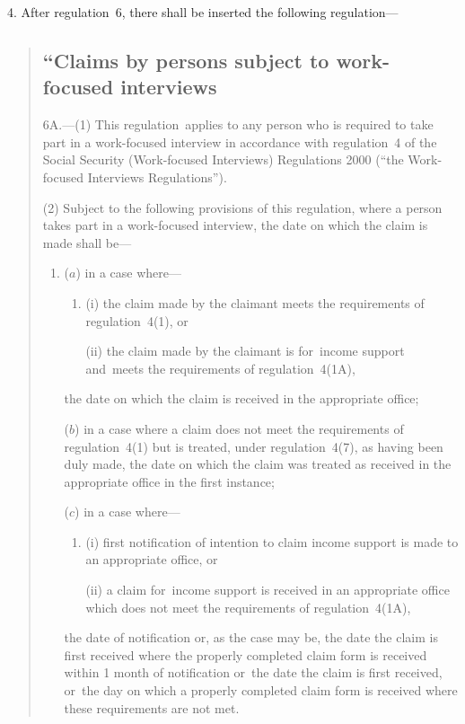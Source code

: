 \documentclass[12pt,a4paper]{article}
\begin{document}
4.  After regulation~6, there shall be inserted the following regulation—
\begin{quotation}
\subsection*{“Claims by persons subject to work-focused interviews}

6A.---(1)  This regulation~applies to any person who is required to take part in a work-focused interview in accordance with regulation~4 of the Social Security (Work-focused Interviews) Regulations 2000 (“the Work-focused Interviews Regulations”).

(2) Subject to the following provisions of this regulation, where a person takes part in a work-focused interview, the date on which the claim is made shall be—
\begin{enumerate}\item[]
($a$) in a case where—
\begin{enumerate}\item[]
(i) the claim made by the claimant meets the requirements of regulation~4(1), or

(ii) the claim made by the claimant is for~income support and~meets the requirements of regulation~4(1A),
\end{enumerate}
the date on which the claim is received in the appropriate office;

($b$) in a case where a claim does not meet the requirements of regulation~4(1) but is treated, under regulation~4(7), as having been duly made, the date on which the claim was treated as received in the appropriate office in the first instance;

($c$) in a case where—
\begin{enumerate}\item[]
(i) first notification of intention to claim income support is made to an appropriate office, or

(ii) a claim for~income support is received in an appropriate office which does not meet the requirements of regulation~4(1A),
\end{enumerate}
the date of notification or, as the case may be, the date the claim is first received where the properly completed claim form is received within 1 month of notification or~the date the claim is first received, or~the day on which a properly completed claim form is received where these requirements are not met.
\end{enumerate}


\end{quotation}
\end{document}
